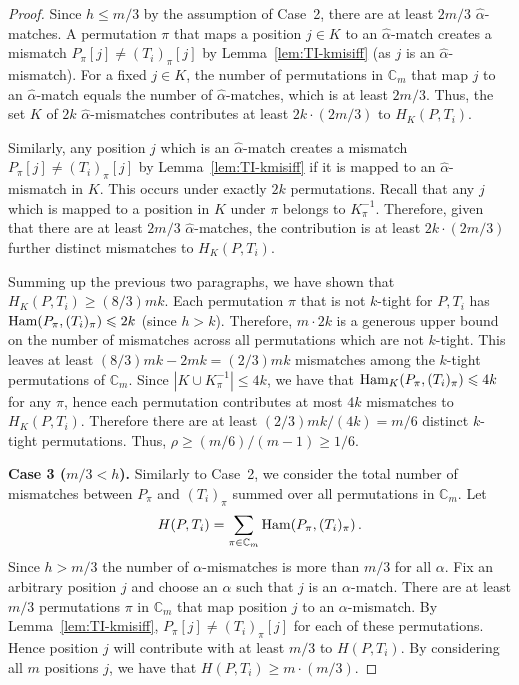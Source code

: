 \documentclass[11pt]{article}
\renewcommand{\geq}{\geqslant}
\renewcommand{\leq}{\leqslant}
\newcommand{\alphah}{\widehat{\alpha}}
\newcommand{\ham}{\ensuremath{\textup{Ham}}}
\newcommand{\Fam}{\ensuremath{\mathbb{C}_m}}
\theoremstyle{plain}
\theoremstyle{definition}
\begin{document}
\begin{proof}
    Since $h\leq m/3$ by the assumption of Case~2, there are at least $2m/3$ $\alphah$-matches. A permutation $\pi$ that maps a position $j \in K$ to an $\alphah$-match creates a mismatch $P_{\pi}[j] \neq (T_i)_\pi[j]$ by Lemma~\ref{lem:TI-kmisiff} (as $j$ is an $\alphah$-mismatch). For a fixed $j\in K$, the number of permutations in $\Fam$ that map $j$ to an $\alphah$-match equals the number of $\alphah$-matches, which is at least $2m/3$. Thus, the set $K$ of $2k$ $\alphah$-mismatches contributes at least $2k \cdot (2m/3)$ to $H_K(P,T_i)$.

    Similarly, any position $j$ which is an $\alphah$-match creates a mismatch $P_{\pi}[j] \neq (T_i)_\pi[j]$ by Lemma~\ref{lem:TI-kmisiff} if it is mapped to an $\alphah$-mismatch in $K$. This occurs under exactly $2k$ permutations. Recall that any $j$ which is mapped to a position in $K$ under $\pi$ belongs to $K_\pi^{-1}$. Therefore, given that there are at least $2m/3$ $\alphah$-matches, the contribution is at least $2k \cdot (2m/3)$ further distinct mismatches to  $H_K(P,T_i)$.

    Summing up the previous two paragraphs, we have shown that $H_K(P,T_i) \geq (8/3)mk$.
    Each permutation $\pi$ that is not $k$-tight for $P,T_i$ has $\ham(P_\pi,(T_i)_\pi) \leq 2k$ (since $h>k$). Therefore, $m \cdot 2k$ is a generous upper bound on the number of mismatches across all permutations which are not $k$-tight. This leaves at least $(8/3)mk-2mk=(2/3)mk$ mismatches among the $k$-tight permutations of $\Fam$. Since $|K \cup K_\pi^{-1}| \leq 4k$, we have that $\ham_K(P_\pi,(T_i)_\pi) \leq 4k$ for any $\pi$, hence each permutation contributes at most $4k$ mismatches to $H_K(P,T_i)$. Therefore there are at least $(2/3)mk/(4k)=m/6$ distinct $k$-tight permutations. Thus, $\rho \geq (m/6)/(m-1) \geq 1/6$.
    \medskip

    \noindent
    \textbf{Case 3 ($m/3 < h$).}
    Similarly to Case~2, we consider the total number of mismatches between $P_\pi$ and $(T_i)_\pi$ summed over all permutations in $\Fam$. Let
\begin{equation*}
        H(P,T_i) = \sum_{\pi \in \Fam} \ham(P_\pi,(T_i)_\pi) \,.
    \end{equation*}
Since $h > {m/3}$ the number of $\alpha$-mismatches is more than $m/3$ for all $\alpha$. Fix an arbitrary position $j$ and choose an $\alpha$ such that $j$ is an $\alpha$-match. There are at least $m/3$ permutations $\pi$ in $\Fam$ that map position $j$ to an $\alpha$-mismatch. By Lemma~\ref{lem:TI-kmisiff}, $P_\pi[j] \neq (T_i)_\pi[j]$ for each of these permutations. Hence position $j$ will contribute with at least $m/3$ to $H(P,T_i)$. By considering all $m$ positions $j$, we have that $H(P,T_i) \geq m\cdot (m/3)$.


\end{proof}
\end{document}
